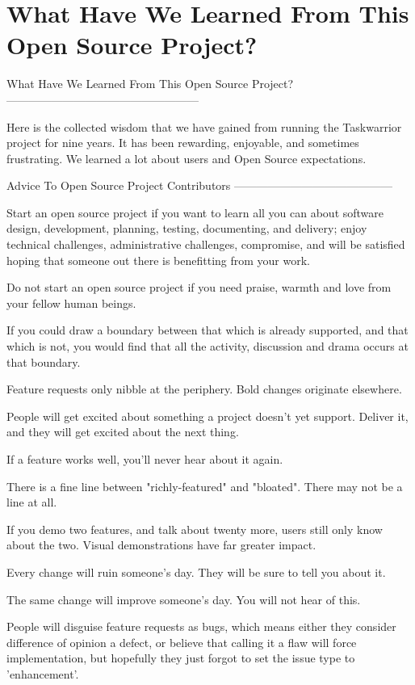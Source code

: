 \documentclass[t,handout]{beamer}
\begin{document}
\section{What Have We Learned From This Open Source Project?}

\iffalse
What Have We Learned From This Open Source Project?
---------------------------------------------------

Here is the collected wisdom that we have gained from running the Taskwarrior project for nine years. It has been rewarding, enjoyable, and sometimes frustrating. We learned a lot about users and Open Source expectations.

Advice To Open Source Project Contributors
------------------------------------------

Start an open source project if you want to learn all you can about software design, development, planning, testing, documenting, and delivery; enjoy technical challenges, administrative challenges, compromise, and will be satisfied hoping that someone out there is benefitting from your work.

Do not start an open source project if you need praise, warmth and love from your fellow human beings.

If you could draw a boundary between that which is already supported, and that which is not, you would find that all the activity, discussion and drama occurs at that boundary.

Feature requests only nibble at the periphery. Bold changes originate elsewhere.

People will get excited about something a project doesn't yet support. Deliver it, and they will get excited about the next thing.

If a feature works well, you’ll never hear about it again.

There is a fine line between "richly-featured" and "bloated". There may not be a line at all.

If you demo two features, and talk about twenty more, users still only know about the two. Visual demonstrations have far greater impact.

Every change will ruin someone’s day. They will be sure to tell you about it.

The same change will improve someone's day. You will not hear of this.

People will disguise feature requests as bugs, which means either they consider difference of opinion a defect, or believe that calling it a flaw will force implementation, but hopefully they just forgot to set the issue type to 'enhancement'.
\end{document}
